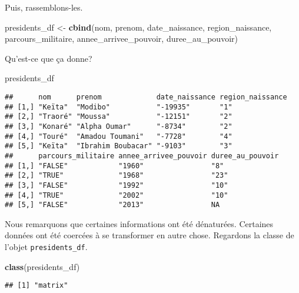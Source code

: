 \documentclass[]{book}
\newenvironment{Shaded}{\begin{snugshade}}{\end{snugshade}}
\newcommand{\KeywordTok}[1]{\textcolor[rgb]{0.13,0.29,0.53}{\textbf{#1}}}
\newcommand{\StringTok}[1]{\textcolor[rgb]{0.31,0.60,0.02}{#1}}
\newcommand{\NormalTok}[1]{#1}
\begin{document}
Puis, rassemblons-les.

\begin{Shaded}
\begin{Highlighting}[]
\NormalTok{presidents_df <-}\StringTok{ }\KeywordTok{cbind}\NormalTok{(nom,}
\NormalTok{                       prenom,}
\NormalTok{                       date_naissance,}
\NormalTok{                       region_naissance,}
\NormalTok{                       parcours_militaire,}
\NormalTok{                       annee_arrivee_pouvoir,}
\NormalTok{                       duree_au_pouvoir)}
\end{Highlighting}
\end{Shaded}

Qu'est-ce que ça donne?

\begin{Shaded}
\begin{Highlighting}[]
\NormalTok{presidents_df}
\end{Highlighting}
\end{Shaded}

\begin{verbatim}
##      nom      prenom             date_naissance region_naissance
## [1,] "Keïta"  "Modibo"           "-19935"       "1"             
## [2,] "Traoré" "Moussa"           "-12151"       "2"             
## [3,] "Konaré" "Alpha Oumar"      "-8734"        "2"             
## [4,] "Touré"  "Amadou Toumani"   "-7728"        "4"             
## [5,] "Keïta"  "Ibrahim Boubacar" "-9103"        "3"             
##      parcours_militaire annee_arrivee_pouvoir duree_au_pouvoir
## [1,] "FALSE"            "1960"                "8"             
## [2,] "TRUE"             "1968"                "23"            
## [3,] "FALSE"            "1992"                "10"            
## [4,] "TRUE"             "2002"                "10"            
## [5,] "FALSE"            "2013"                NA
\end{verbatim}

Nous remarquons que certaines informations ont été dénaturées. Certaines
données ont été coercées à se transformer en autre chose. Regardons la
classe de l'objet \texttt{presidents\_df}.

\begin{Shaded}
\begin{Highlighting}[]
\KeywordTok{class}\NormalTok{(presidents_df)}
\end{Highlighting}
\end{Shaded}

\begin{verbatim}
## [1] "matrix"
\end{verbatim}
\end{document}

